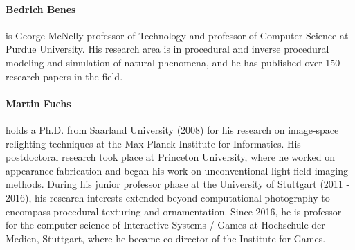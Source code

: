 \documentclass{egpubl}
\begin{document}
\paragraph*{Bedrich Benes} is George McNelly professor of Technology and professor of Computer Science at Purdue University. His research area is in procedural and inverse procedural modeling and simulation of natural phenomena, and he has published over 150 research papers in the field.


\paragraph*{Martin Fuchs}  holds a Ph.D. from Saarland University (2008) for his research on image-space relighting techniques at the Max-Planck-Institute for Informatics. His postdoctoral research took place at Princeton University, where he worked on appearance fabrication and began his work on unconventional light field imaging methods. During his junior professor phase at the University of Stuttgart (2011 - 2016), his research interests extended beyond computational photography to encompass procedural texturing and ornamentation. Since 2016, he is professor for the computer science of Interactive Systems / Games at Hochschule der Medien, Stuttgart, where he became co-director of the Institute for Games.



%  
%        




\printbibliography
\end{document}
